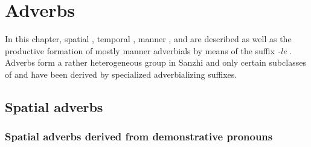 \chapter{Adverbs}
\label{cpt:morph-adverbs}

In this chapter, spatial , temporal , manner , and   are described as well as the productive formation of mostly manner adverbials by means of the suffix \textit{-le} . Adverbs form a rather heterogeneous group in Sanzhi and only certain subclasses of  and  have been derived by specialized adverbializing suffixes.



\section{Spatial adverbs}
\label{sec:spatialadverb}



\subsection{Spatial adverbs derived from demonstrative pronouns}
\label{ssec:SpatialAdverbsDerivedFromDemonstrativePronouns}

